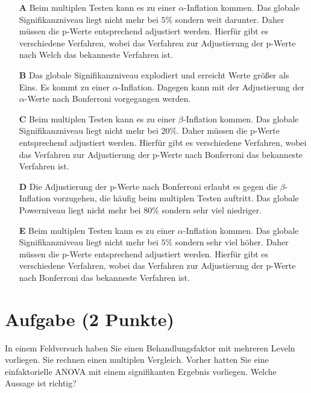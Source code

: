 \documentclass[a4paper, 9pt]{scrartcl}\usepackage[]{graphicx}\usepackage[]{xcolor}
\begin{document}
\begin{enumerate}
\item [\textbf{A} \msquare] Beim multiplen Testen kann es zu einer $\alpha$-Inflation kommen. Das globale Signifikanzniveau liegt nicht mehr bei $5\%$ sondern weit darunter. Daher müssen die p-Werte entsprechend adjustiert werden. Hierfür gibt es verschiedene Verfahren, wobei das Verfahren zur Adjustierung der p-Werte nach Welch das bekanneste Verfahren ist.
\item [\textbf{B} \msquare] Das globale Signifikanzniveau explodiert und erreicht Werte größer als Eins. Es kommt zu einer $\alpha$-Inflation. Dagegen kann mit der Adjustierung der $\alpha$-Werte nach Bonferroni vorgegangen werden.
\item [\textbf{C} \msquare] Beim multiplen Testen kann es zu einer $\beta$-Inflation kommen. Das globale Signifikanzniveau liegt nicht mehr bei $20\%$. Daher müssen die p-Werte entsprechend adjustiert werden. Hierfür gibt es verschiedene Verfahren, wobei das Verfahren zur Adjustierung der p-Werte nach Bonferroni das bekanneste Verfahren ist.
\item [\textbf{D} \msquare] Die Adjustierung der p-Werte nach Bonferroni erlaubt es gegen die $\beta$-Inflation vorzugehen, die häufig beim multiplen Testen auftritt. Das globale Powerniveau liegt nicht mehr bei $80\%$ sondern sehr viel niedriger.
\item [\textbf{E} \msquare] Beim multiplen Testen kann es zu einer $\alpha$-Inflation kommen. Das globale Signifikanzniveau liegt nicht mehr bei $5\%$ sondern sehr viel höher. Daher müssen die p-Werte entsprechend adjustiert werden. Hierfür gibt es verschiedene Verfahren, wobei das Verfahren zur Adjustierung der p-Werte nach Bonferroni das bekanneste Verfahren ist.
\end{enumerate}

\section{Aufgabe \hfill (2 Punkte)}




In einem Feldversuch haben Sie einen Behandlungsfaktor mit mehreren Leveln vorliegen. Sie rechnen einen multiplen Vergleich. Vorher hatten Sie eine einfaktorielle ANOVA mit einem signifikanten Ergebnis vorliegen. Welche Aussage ist richtig?
\end{document}
